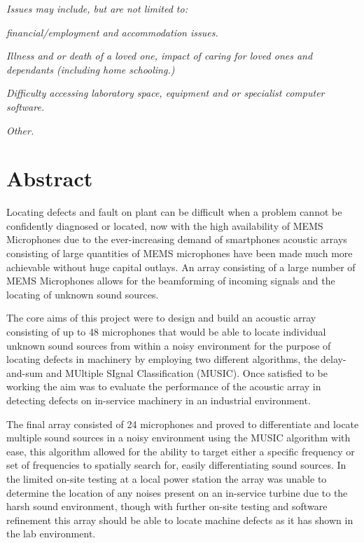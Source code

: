 \documentclass{UoNMCHA}
\numberwithin{equation}{section}
\begin{document}
    \emph{Issues may include, but are not limited to:}
    
    \emph{financial/employment and accommodation issues.}
    
    \emph{Illness and or death of a loved one, impact of caring for loved ones and dependants (including home schooling.)}
    
    \emph{Difficulty accessing laboratory space, equipment and or specialist computer software.}
    
    \emph{Other.}
\newpage
\vspace{-5mm}
\section*{Abstract}
\vspace{-3mm}
    
    Locating defects and fault on plant can be difficult when a problem cannot be confidently diagnosed or located,
    now with the high availability of MEMS Microphones due to the ever-increasing demand of smartphones acoustic arrays consisting of large quantities of MEMS microphones have been made much more achievable without huge capital outlays. An array consisting of a large number of MEMS Microphones allows for the beamforming of incoming signals and the locating of unknown sound sources. 
    
    The core aims of this project were to design and build an acoustic array consisting of up to 48 microphones that would be able to locate individual unknown sound sources from within a noisy environment for the purpose of locating defects in machinery by employing two different algorithms, the delay-and-sum and MUltiple SIgnal Classification (MUSIC). Once satisfied to be working the aim was to evaluate the performance of the acoustic array in detecting defects on in-service machinery in an industrial environment.
    
    The final array consisted of 24 microphones and proved to differentiate and locate multiple sound sources in a noisy environment using the MUSIC algorithm with ease, this algorithm allowed for the ability to target either a specific frequency or set of frequencies to spatially search for, easily differentiating sound sources. In the limited on-site testing at a local power station the array was unable to determine the location of any noises present on an in-service turbine due to the harsh sound environment, though with further on-site testing and software refinement this array should be able to locate machine defects as it has shown in the lab environment.
\end{document}
